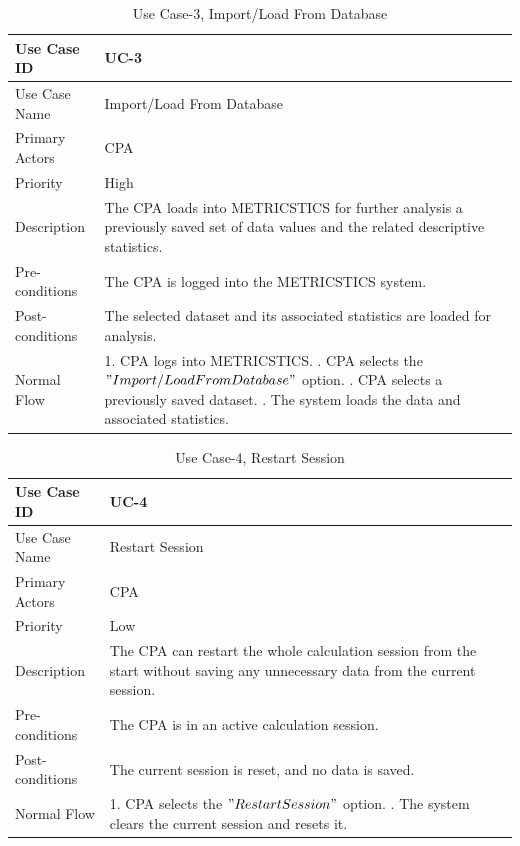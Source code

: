 \begin{table}[H]
\centering
\def\arraystretch{1.5}
\begin{tabular}{|l|p{4.5in}|}
\hline
Use Case ID & UC-3\\ \hline
Use Case Name & Import/Load From Database\\ \hline
Primary Actors & CPA\\ \hline
Priority & High\\ \hline
Description & The CPA loads into METRICSTICS for further analysis a previously saved set of data values and the related descriptive statistics.\\ \hline
Pre-conditions & The CPA is logged into the METRICSTICS system.\\ \hline
Post-conditions & The selected dataset and its associated statistics are loaded for analysis.\\ \hline
Normal Flow & 1. CPA logs into METRICSTICS.
     \newline 2. CPA selects the $"Import/Load From Database"$ option.
     \newline 3. CPA selects a previously saved dataset.
     \newline 4. The system loads the data and associated statistics.
    \\ \hline
\end{tabular}
\caption{Use Case-3, Import/Load From Database}
\end{table}

\begin{table}[H]
\centering
\def\arraystretch{1.5}
\begin{tabular}{|l|p{4.5in}|}
\hline
Use Case ID & UC-4\\ \hline
Use Case Name & Restart Session\\ \hline
Primary Actors & CPA\\ \hline
Priority & Low\\ \hline
Description & The CPA can restart the whole calculation session from the start without saving any unnecessary data from the current session.\\ \hline
Pre-conditions & The CPA is in an active calculation session.\\ \hline
Post-conditions & The current session is reset, and no data is saved.\\ \hline
Normal Flow & 1. CPA selects the $"Restart Session"$ option.
     \newline 2. The system clears the current session and resets it.
    \\ \hline
\end{tabular}
\caption{Use Case-4, Restart Session}
\end{table}



